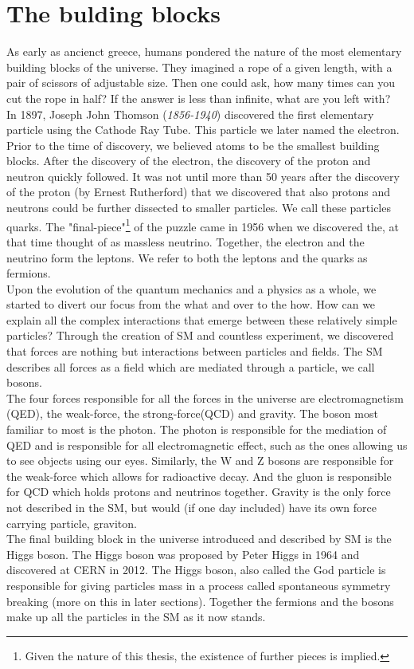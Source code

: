 \section{The bulding blocks}
As early as ancienct greece, humans pondered the nature of the most elementary building blocks of
the universe. They imagined a rope of a given length, with a pair of scissors of adjustable size.
Then one could ask, how many times can you cut the rope in half? If the answer is less than infinite,
what are you left with?
\\
In 1897, Joseph John Thomson (\emph{1856-1940}) discovered the first elementary particle using the Cathode Ray Tube. 
This particle we later named the electron. Prior to the time of discovery, we believed atoms to 
be the smallest building blocks. After the discovery of the electron, the discovery of the 
proton and neutron quickly followed. It was not until more than 50 years after the discovery of 
the proton (by Ernest Rutherford) that we discovered that also protons and neutrons could be further
dissected to smaller particles. We call these particles quarks. The "final-piece"\footnote{Given the
nature of this thesis, the existence of further pieces is implied.} of the puzzle came
in 1956 when we discovered the, at that time thought of as massless neutrino. Together, the 
electron and the neutrino form the leptons. We refer to both the leptons and the quarks as fermions.
\\
Upon the evolution of the quantum mechanics and a physics as a whole, we started to divert
our focus from the what and over to the how. How can we explain all the complex interactions
that emerge between these relatively simple particles? Through the creation of \ac{SM} and countless 
experiment, we discovered that forces are nothing but interactions between particles and fields.
The \ac{SM} describes all forces as a field which are mediated through a particle, we call bosons. 
\\
The four forces responsible for all the forces in the universe are electromagnetism (\ac{QED}), the weak-force, the strong-force(\ac{QCD})
and gravity. The boson most familiar to most is the photon. The photon is responsible for the mediation 
of \ac{QED} and is responsible for all electromagnetic effect, such as the ones allowing
us to see objects using our eyes. Similarly, the W and Z bosons are responsible for the weak-force which
allows for radioactive decay. And the gluon is responsible for \ac{QCD} which holds protons and 
neutrinos together. Gravity is the only force not described in the SM, but would (if one day included)
have its own force carrying particle, graviton. 
\\
The final building block in the universe introduced and described by \ac{SM} is the Higgs boson.
The Higgs boson was proposed by Peter Higgs in 1964 and discovered at CERN in 2012. The Higgs boson,
also called the God particle is responsible for giving particles mass in a process called
spontaneous symmetry breaking (more on this in later sections). Together the fermions and the bosons
make up all the particles in the \ac{SM} as it now stands.
